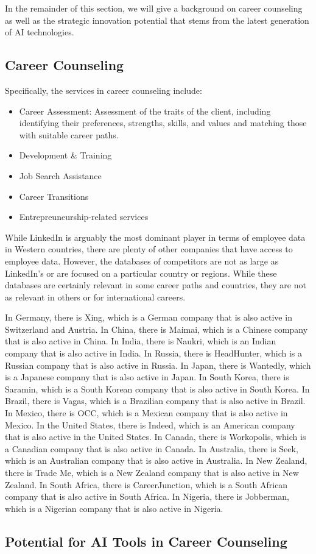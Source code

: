 In the remainder of this section, we will give a background on career counseling as well as the strategic innovation
potential that stems from the latest generation of AI technologies.

\subsection{Career Counseling}

Specifically, the services
in career counseling include:

\begin{itemize}
    \item Career Assessment: Assessment of the traits of the client, including identifying their preferences,
            strengths, skills, and values and matching those with suitable career paths.
    \item Development \& Training
    \item Job Search Assistance
    \item Career Transitions
    \item Entrepreuneurship-related services
\end{itemize}

While LinkedIn is arguably the most dominant player in terms of employee data in Western countries,
there are plenty of other companies that have access to employee data. However, the databases of competitors are
not as large as LinkedIn's or are focused on a particular country or regions. While these databases are certainly
relevant in some career paths and countries, they are not as relevant in others or for international careers.

In Germany, there is Xing, which is a German company that is also active in Switzerland and Austria.
In China, there is Maimai, which is
a Chinese company that is also active in China. In India, there is Naukri, which is an Indian company that is also
active in India. In Russia, there is HeadHunter, which is a Russian company that is also active in Russia. In Japan,
there is Wantedly, which is a Japanese company that is also active in Japan. In South Korea, there is Saramin, which
is a South Korean company that is also active in South Korea. In Brazil, there is Vagas, which is a Brazilian company
that is also active in Brazil. In Mexico, there is OCC, which is a Mexican company that is also active in Mexico.
In the United States, there is Indeed, which is an American company that is also active in the United States. In
Canada, there is Workopolis, which is a Canadian company that is also active in Canada. In Australia, there is
Seek, which is an Australian company that is also active in Australia. In New Zealand, there is Trade Me, which is
a New Zealand company that is also active in New Zealand. In South Africa, there is CareerJunction, which is a
South African company that is also active in South Africa. In Nigeria, there is Jobberman, which is a Nigerian
company that is also active in Nigeria.

\subsection{Potential for AI Tools in Career Counseling}